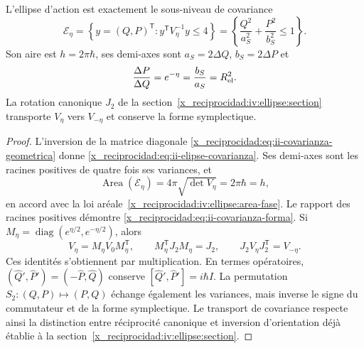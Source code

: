 \begin{proposition}
\label{x_reciprocidad:prop:ii-area-covarianza-reciprocidad}
L'ellipse d'action est exactement le sous-niveau de covariance
\begin{equation}
 \mathcal E_\eta
 =\left\{y=(Q,P)^{\mathsf T}:y^{\mathsf T}V_\eta^{-1}y\leq4\right\}
 =\left\{\frac{Q^2}{a_S^2}+\frac{P^2}{b_S^2}\leq1\right\}.
 \label{x_reciprocidad:eq:ii-elipse-covarianza}
\end{equation}
Son aire est \(h=2\pi\hbar\), ses demi-axes sont
\(a_S=2\Delta Q\), \(b_S=2\Delta P\) et
\begin{equation}
 \frac{\Delta P}{\Delta Q}=e^{-\eta}
 =\frac{b_S}{a_S}=R_{\rm el}^2.
 \label{x_reciprocidad:eq:ii-covarianza-forma}
\end{equation}
La rotation canonique \(J_2\) de la section~\ref{x_reciprocidad:iv:ellipse:section} transporte
\(V_\eta\) vers \(V_{-\eta}\) et conserve la forme symplectique.
\end{proposition}

\begin{proof}
L'inversion de la matrice diagonale
\eqref{x_reciprocidad:eq:ii-covarianza-geometrica} donne
\eqref{x_reciprocidad:eq:ii-elipse-covarianza}. Ses demi-axes sont les racines positives de
quatre fois ses variances, et
\[
 \operatorname{Area}(\mathcal E_\eta)
 =4\pi\sqrt{\det V_\eta}=2\pi\hbar=h,
\]
en accord avec la loi aréale~\eqref{x_reciprocidad:iv:ellipse:area-fase}.
Le rapport des racines positives démontre
\eqref{x_reciprocidad:eq:ii-covarianza-forma}.
Si \(M_\eta=\operatorname{diag}(e^{\eta/2},e^{-\eta/2})\), alors
\[
 V_\eta=M_\eta V_0M_\eta^{\mathsf T},\qquad
 M_\eta^{\mathsf T}J_2M_\eta=J_2,\qquad
 J_2V_\eta J_2^{\mathsf T}=V_{-\eta}.
\]
Ces identités s'obtiennent par multiplication. En termes opératoires,
\((\widehat Q',\widehat P')=(-\widehat P,\widehat Q)\) conserve
\([\widehat Q',\widehat P']=i\hbar I\). La permutation
\(S_2:(Q,P)\mapsto(P,Q)\) échange également les variances, mais inverse
le signe du commutateur et de la forme symplectique. Le transport de
covariance respecte ainsi la distinction entre réciprocité canonique et inversion
d'orientation déjà établie à la section~\ref{x_reciprocidad:iv:ellipse:section}.
\end{proof}


